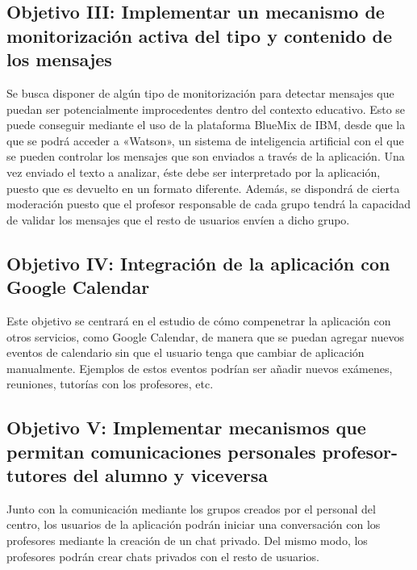 \documentclass{pre-tfg}
\begin{document}
\subsection{Objetivo III: Implementar un mecanismo de monitorización activa del tipo y contenido de los mensajes}
Se busca disponer de algún tipo de monitorización para detectar mensajes que puedan ser potencialmente improcedentes dentro del contexto educativo. Esto se puede conseguir mediante el uso de la plataforma BlueMix de IBM, desde que la que se podrá acceder a «Watson», un sistema de inteligencia artificial con el que se pueden controlar los mensajes que son enviados a través de la aplicación. Una vez enviado el texto a analizar, éste debe ser interpretado por la aplicación, puesto que es devuelto en un formato diferente. Además, se dispondrá de cierta moderación puesto que el profesor responsable de cada grupo tendrá la capacidad de validar los mensajes que el resto de usuarios envíen a dicho grupo.

\subsection{Objetivo IV: Integración de la aplicación con Google Calendar}
Este objetivo se centrará en el estudio de cómo compenetrar la aplicación con otros servicios, como Google Calendar, de manera que se puedan agregar nuevos eventos de calendario sin que el usuario tenga que cambiar de aplicación manualmente. Ejemplos de estos eventos podrían ser añadir nuevos exámenes, reuniones, tutorías con los profesores, etc.

\subsection{Objetivo V: Implementar mecanismos que permitan comunicaciones personales profesor-tutores del alumno y viceversa}
Junto con la comunicación mediante los grupos creados por el personal del centro, los usuarios de la aplicación podrán iniciar una conversación con los profesores mediante la creación de un chat privado. Del mismo modo, los profesores podrán crear chats privados con el resto de usuarios.

%
%
%
\end{document}
